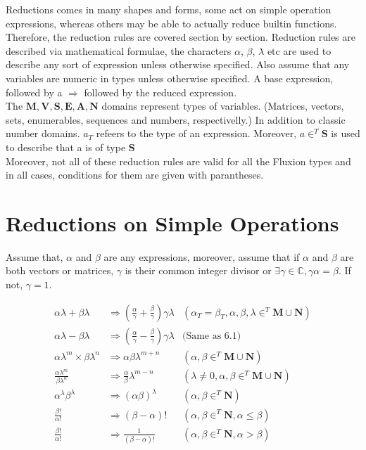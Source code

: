 \documentclass[11pt,a4paper]{book}
\begin{document}
Reductions comes in many shapes and forms, some act on simple operation expressions, whereas others may be able to actually reduce builtin functions. Therefore, the reduction rules are covered section by section. Reduction rules are described via mathematical formulae, the characters $\alpha$, $\beta$, $\lambda$ etc are used to describe any sort of expression unless otherwise specified. Also assume that any variables are numeric in types unless otherwise specified. A base expression, followed by a $\Rightarrow$ followed by the reduced expression. \\

The $\mathbf{M}, \mathbf{V}, \mathbf{S}, \mathbf{E}, \mathbf{A}, \mathbf{N}$ domains represent types of variables. (Matrices, vectors, sets, enumerables, sequences and numbers, respectivelly.) In addition to classic number domains. $a_T$ refeers to the type of an expression. Moreover, $a \in^T \mathbf{S}$ is used to describe that a is of type $\mathbf{S}$ \\

Moreover, not all of these reduction rules are valid for all the Fluxion types and in all cases, conditions for them are given with parantheses.

\section{Reductions on Simple Operations}

Assume that, $\alpha$ and $\beta$ are any expressions, moreover, assume that if $\alpha$ and $\beta$ are both vectors or matrices, $\gamma$ is their common integer divisor or $\exists \gamma \in \mathbb{C}, \gamma\alpha = \beta$. If not, $\gamma = 1$.


\begin{align}
\alpha\lambda + \beta\lambda &\Rightarrow \left( \frac{\alpha}{\gamma} + \frac{\beta}{\gamma}\right)\gamma\lambda & \left( \alpha_T = \beta_T, \alpha, \beta, \lambda \in^T \mathbf{M} \cup \mathbf{N} \right)\\
\alpha\lambda - \beta\lambda &\Rightarrow \left( \frac{\alpha}{\gamma} - \frac{\beta}{\gamma}\right) \gamma\lambda & \text{(Same as 6.1)}\\
\alpha\lambda^m \times \beta\lambda^n &\Rightarrow  \alpha\beta\lambda^{m + n} & \left( \alpha, \beta \in^T \mathbf{M} \cup \mathbf{N} \right)\\
\frac{\alpha\lambda^{m}}{\beta\lambda^{n}} &\Rightarrow \frac{ \alpha}{\beta}\lambda^{m - n} & \left(\lambda \neq 0, \alpha, \beta \in^T \mathbf{M} \cup \mathbf{N} \right)\\
\alpha^{\lambda}\beta^{\lambda} &\Rightarrow \left(\alpha\beta\right)^\lambda & \left( \alpha, \beta \in^T \mathbf{N} \right)\\
\frac{\beta!}{\alpha!} &\Rightarrow \left(\beta - \alpha\right)! & \left( \alpha, \beta \in^T \mathbf{N}, \alpha \leq \beta \right)\\
\frac{\beta!}{\alpha!} &\Rightarrow \frac{1}{\left(\beta - \alpha\right)!} & \left( \alpha, \beta \in^T \mathbf{N}, \alpha > \beta \right)
\end{align}
\end{document}
